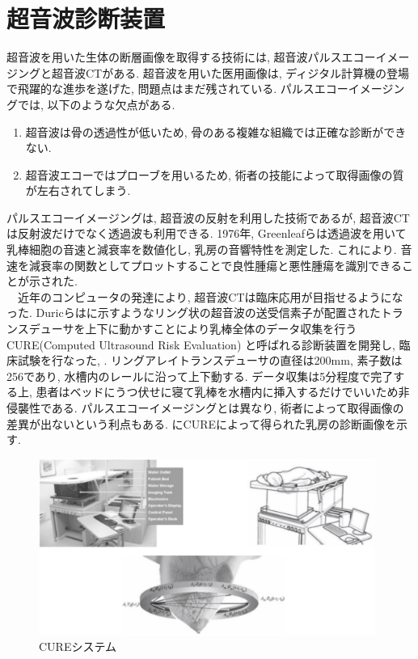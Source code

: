 \section{超音波診断装置}
超音波を用いた生体の断層画像を取得する技術には, 超音波パルスエコーイメージングと超音波CTがある. 超音波を用いた医用画像は, ディジタル計算機の登場で飛躍的な進歩を遂げた, 問題点はまだ残されている. パルスエコーイメージングでは, 以下のような欠点がある. 
\begin{enumerate}
   \item 超音波は骨の透過性が低いため, 骨のある複雑な組織では正確な診断ができない.
   \item 超音波エコーではプローブを用いるため, 術者の技能によって取得画像の質が左右されてしまう.
\end{enumerate}
パルスエコーイメージングは, 超音波の反射を利用した技術であるが, 超音波CTは反射波だけでなく透過波も利用できる. 1976年, Greenleafらは透過波を用いて乳棒細胞の音速と減衰率を数値化し, 乳房の音響特性を測定した\cite{onkyou}. これにより. 音速を減衰率の関数としてプロットすることで良性腫瘍と悪性腫瘍を識別できることが示された.
\\\ \ 近年のコンピュータの発達により, 超音波CTは臨床応用が目指せるようになった. Duricらはに示すようなリング状の超音波の送受信素子が配置されたトランスデューサを上下に動かすことにより乳棒全体のデータ収集を行うCURE(Computed Ultrasound Risk Evaluation) と呼ばれる診断装置を開発し, 臨床試験を行なった\cite{cure1}, \cite{cure2}. リングアレイトランスデューサの直径は200mm, 素子数は256であり, 水槽内のレールに沿って上下動する. データ収集は5分程度で完了する上, 患者はベッドにうつ伏せに寝て乳棒を水槽内に挿入するだけでいいため非侵襲性である. パルスエコーイメージングとは異なり, 術者によって取得画像の差異が出ないという利点もある. にCUREによって得られた乳房の診断画像を示す.
\begin{figure}[h]
  \begin{center}
    \includegraphics[width=110mm]{fig/curesystem.pdf}
  \end{center}
  \caption{CUREシステム}
\end{figure}

